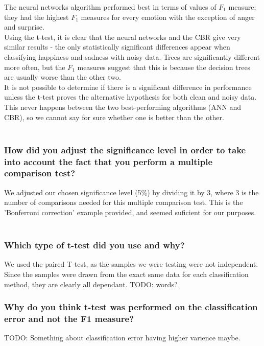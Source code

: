 \documentclass[12pt]{article}
\begin{document}
The neural networks algorithm performed best in terms of values of $F_1$ measure; they had the highest $F_1$ measures for every emotion with the exception of anger and surprise. \\
Using the t-test, it is clear that the neural networks and the CBR give very similar results - the only statistically significant differences appear when classifying happiness and sadness with noisy data. Trees are significantly different more often, but the $F_1$ measures suggest that this is because the decision trees are usually worse than the other two. \\
It is not possible to determine if there is a significant difference in performance unless the t-test proves the alternative hypothesis for both clean and noisy data. This never happens between the two best-performing algorithms (ANN and CBR), so we cannot say for sure whether one is better than the other. \\ \\

\subsubsection*{How did you adjust the significance level in order to take into account the fact that you perform a multiple comparison test?}

We adjusted our chosen significance level (5\%) by dividing it by 3, where 3 is the number of comparisons needed for this multiple comparison test. This is the 'Bonferroni correction' example provided, and seemed suficient for our purposes. \\ \\

\subsubsection*{Which type of t-test did you use and why?}

We used the paired T-test, as the samples we were testing were not independent. Since the samples were drawn from the exact same data for each classification method, they are clearly all dependant. TODO: words?

\subsubsection*{Why do you think t-test was performed on the classification error and not the F1 measure?}

TODO: Something about classification error having higher varience maybe.
\end{document}
